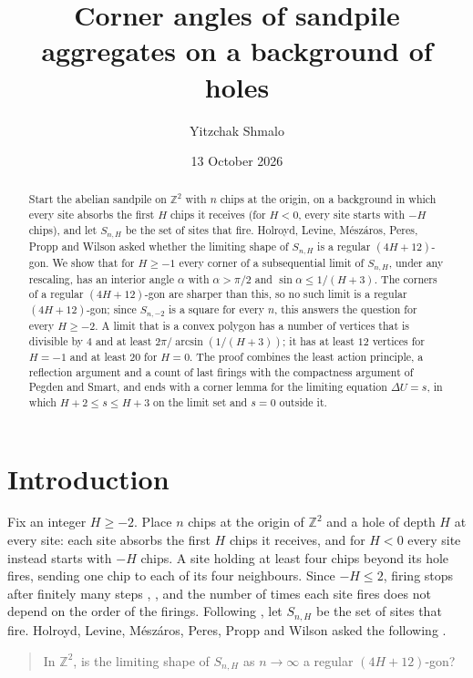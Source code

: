 \documentclass[11pt]{amsart}
\title[Corner angles of sandpile aggregates]{Corner angles of sandpile aggregates on a background of holes}
\author{Yitzchak Shmalo}
\date{13 October 2026}
\theoremstyle{remark}
\numberwithin{equation}{section}
\newcommand{\Z}{\mathbb Z}
\begin{document}
\begin{abstract}
Start the abelian sandpile on $\Z^2$ with $n$ chips at the origin, on a background in which every site absorbs the first $H$ chips it receives (for $H<0$, every site starts with $-H$ chips), and let $S_{n,H}$ be the set of sites that fire. Holroyd, Levine, M\'esz\'aros, Peres, Propp and Wilson asked whether the limiting shape of $S_{n,H}$ is a regular $(4H+12)$-gon. We show that for $H\ge-1$ every corner of a subsequential limit of $S_{n,H}$, under any rescaling, has an interior angle $\alpha$ with $\alpha>\pi/2$ and $\sin\alpha\le1/(H+3)$. The corners of a regular $(4H+12)$-gon are sharper than this, so no such limit is a regular $(4H+12)$-gon; since $S_{n,-2}$ is a square for every $n$, this answers the question for every $H\ge-2$. A limit that is a convex polygon has a number of vertices that is divisible by $4$ and at least $2\pi/\arcsin(1/(H+3))$; it has at least $12$ vertices for $H=-1$ and at least $20$ for $H=0$. The proof combines the least action principle, a reflection argument and a count of last firings with the compactness argument of Pegden and Smart, and ends with a corner lemma for the limiting equation $\Delta U=s$, in which $H+2\le s\le H+3$ on the limit set and $s=0$ outside it.
\end{abstract}
\maketitle

\section{Introduction}

Fix an integer $H\ge-2$. Place $n$ chips at the origin of $\Z^2$ and a hole of depth $H$ at every site: each site absorbs the first $H$ chips it receives, and for $H<0$ every site instead starts with $-H$ chips. A site holding at least four chips beyond its hole fires, sending one chip to each of its four neighbours. Since $-H\le2$, firing stops after finitely many steps \cite{FR}, \cite[Section~1]{FLP}, and the number of times each site fires does not depend on the order of the firings. Following \cite[Section~6]{HLMPPW}, let $S_{n,H}$ be the set of sites that fire. Holroyd, Levine, M\'esz\'aros, Peres, Propp and Wilson asked the following \cite[Question~6.2]{HLMPPW}.

\begin{quote}
In $\Z^2$, is the limiting shape of $S_{n,H}$ as $n\to\infty$ a regular $(4H+12)$-gon?
\end{quote}
\end{document}

